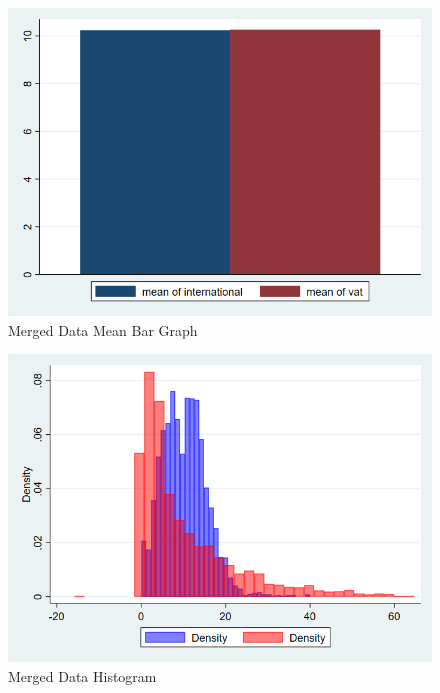 \documentclass[12pt]{article}
\begin{document}
\begin{figure}
    \centering
    \includegraphics[width=0.5\linewidth]{mergedbar.png}
    \caption{Merged Data Mean Bar Graph}
    \label{fig:enter-label}
\end{figure}
\begin{figure}
    \centering
    \includegraphics[width=0.5\linewidth]{.github/mergedhistogram.png}
    \caption{Merged Data Histogram}
    \label{fig:enter-label}
\end{figure}
\end{document}
